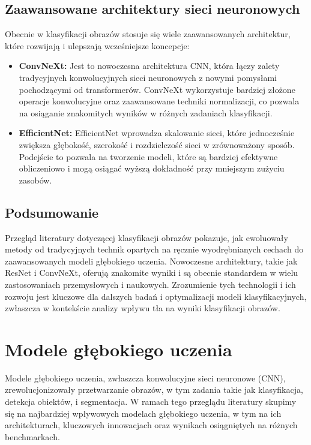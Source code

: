 \subsection*{Zaawansowane architektury sieci neuronowych}

Obecnie w klasyfikacji obrazów stosuje się wiele zaawansowanych architektur, 
które rozwijają i ulepszają wcześniejsze koncepcje:

\begin{itemize}
    \item \textbf{ConvNeXt:} Jest to nowoczesna architektura CNN, która łączy zalety tradycyjnych 
    konwolucyjnych sieci neuronowych z nowymi pomysłami pochodzącymi od transformerów. 
    ConvNeXt wykorzystuje bardziej złożone operacje konwolucyjne oraz zaawansowane techniki 
    normalizacji, co pozwala na osiąganie znakomitych wyników w różnych zadaniach klasyfikacji.
    \item \textbf{EfficientNet:}  EfficientNet wprowadza skalowanie sieci, które jednocześnie 
    zwiększa głębokość, szerokość i rozdzielczość sieci w zrównoważony sposób. Podejście to 
    pozwala na tworzenie modeli, które są bardziej efektywne obliczeniowo i mogą osiągać wyższą 
    dokładność przy mniejszym zużyciu zasobów.
\end{itemize}

\subsection*{Podsumowanie}
Przegląd literatury dotyczącej klasyfikacji obrazów pokazuje, jak ewoluowały metody od 
tradycyjnych technik opartych na ręcznie wyodrębnianych cechach do zaawansowanych modeli 
głębokiego uczenia. Nowoczesne architektury, takie jak ResNet i ConvNeXt, oferują znakomite 
wyniki i są obecnie standardem w wielu zastosowaniach przemysłowych i naukowych. Zrozumienie 
tych technologii i ich rozwoju jest kluczowe dla dalszych badań i optymalizacji modeli 
klasyfikacyjnych, zwłaszcza w kontekście analizy wpływu tła na wyniki klasyfikacji obrazów.

\section*{Modele głębokiego uczenia}

Modele głębokiego uczenia, zwłaszcza konwolucyjne sieci neuronowe (CNN), zrewolucjonizowały 
przetwarzanie obrazów, w tym zadania takie jak klasyfikacja, detekcja obiektów, i segmentacja. 
W ramach tego przeglądu literatury skupimy się na najbardziej wpływowych modelach głębokiego uczenia, 
w tym na ich architekturach, kluczowych innowacjach oraz wynikach osiągniętych na różnych benchmarkach.


